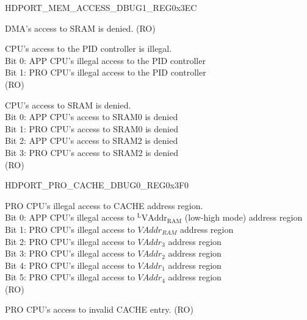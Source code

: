 \begin{register}{H}{DPORT\_MEM\_ACCESS\_DBUG1\_REG}{0x3EC}\label{regdesc:MEMACCESSDBUG1REG}
%
%
%
%
%
\regnewline%
\begin{regdesc}\begin{reglist}
\item [DPORT\_DMA\_ACCESS\_DENY] DMA's access to SRAM is denied. (RO)
\item [DPORT\_ACCESS\_PID\_ILLEGAL] CPU's access to the PID controller is illegal. \\
Bit 0: APP CPU's illegal access to the PID controller\\
Bit 1: PRO CPU's illegal access to the PID controller\\
(RO)
\item [DPORT\_MEM\_ACCESS\_MISS] CPU's access to SRAM is denied.\\
Bit 0: APP CPU's access to SRAM0 is denied\\
Bit 1: PRO CPU's access to SRAM0 is denied\\
Bit 2: APP CPU's access to SRAM2 is denied\\
Bit 3: PRO CPU's access to SRAM2 is denied\\
(RO)
\end{reglist}\end{regdesc}
\end{register}

\begin{register}{H}{DPORT\_PRO\_CACHE\_DBUG0\_REG}{0x3F0}\label{regdesc:DPORTPROCACHEDBUG0REG}
%
%
%
\regnewline%
\begin{regdesc}\begin{reglist}
\item [DPORT\_PRO\_CACHE\_ACCESS\_ILLEGAL] PRO CPU's illegal access to CACHE address region. \\
Bit 0: APP CPU's illegal access to $^{\mathrm{L}}\mathrm{VAddr}_{\mathrm{RAM}}$ (low-high mode) address region\\
Bit 1: PRO CPU's illegal access to ${VAddr}_{RAM}$ address region\\
Bit 2: PRO CPU's illegal access to $VAddr_3$ address region\\
Bit 3: PRO CPU's illegal access to $VAddr_2$ address region\\
Bit 4: PRO CPU's illegal access to $VAddr_1$ address region\\
Bit 5: PRO CPU's illegal access to $VAddr_4$ address region\\
(RO)
\item [DPORT\_PRO\_CACHE\_MMU\_ILLEGAL] PRO CPU's access to invalid CACHE entry. (RO)
\end{reglist}\end{regdesc}
\end{register}

